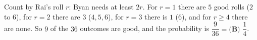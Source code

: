 Count by Rai's roll $r$: Byan needs at least $2r$. For $r=1$ there are $5$ good rolls ($2$ to $6$), for $r=2$ there are $3$ ($4,5,6$), for $r=3$ there is $1$ ($6$), and for $r\ge4$ there are none. So $9$ of the $36$ outcomes are good, and the probability is $\dfrac9{36}=\boxed{\textbf{(B) }\dfrac14}$.
